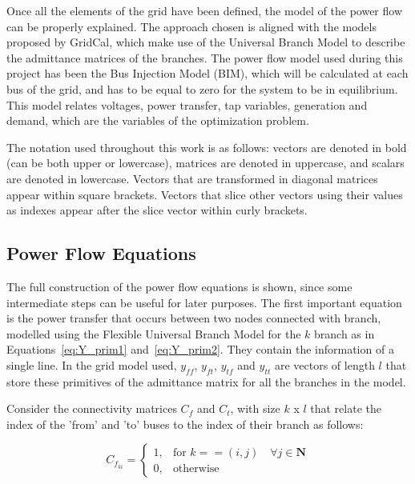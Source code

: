
Once all the elements of the grid have been defined, the model of the power flow can be properly explained.
The approach chosen is aligned with the models proposed by GridCal, which make use of the Universal Branch Model to describe 
the admittance matrices of the branches. The power flow model used during this project has been the Bus Injection Model (BIM),
which will be calculated at each bus of the grid, and has to be equal to zero for the system to be in equilibrium. This model
relates voltages, power transfer, tap variables, generation and demand, which are the variables of the optimization problem.

The notation used throughout this work is as follows: vectors are denoted in bold (can be both upper or lowercase), matrices are denoted in uppercase, and scalars are denoted in lowercase.
Vectors that are transformed in diagonal matrices appear within square brackets. Vectors that slice other vectors using their values as indexes appear after the slice vector within curly brackets.

\subsection{Power Flow Equations}

The full construction of the power flow equations is shown, since some intermediate steps can be useful for later purposes. 
The first important equation is the power transfer that occurs between two nodes connected with branch, modelled using the Flexible Universal Branch Model for the $k$ branch as in Equations~\eqref{eq:Y_prim1} and~\eqref{eq:Y_prim2}.
They contain the information of a single line. In the grid model used, $y_{ff}$, $y_{ft}$, $y_{tf}$ and $y_{tt}$ are vectors of length $l$ that store 
these primitives of the admittance matrix for all the branches in the model.

Consider the connectivity matrices $C_f$ and $C_t$, with size $k$ x $l$ that relate the index of the 'from' and 'to' buses to the index of their branch as follows:

\begin{equation}
    C_{f_{ki}} =    
    \begin{cases}
    1, & \text{for } k == (i, j) \quad \forall j \in \bm {N}\\
    0, & \text{otherwise}
    \end{cases}
\end{equation}

